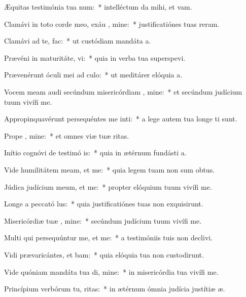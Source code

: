 \item Æquitas testimónia tua  num:~* intelléctum da mihi, et vam.
\item Clamávi in toto corde meo, exáu , mine:~* justificatiónes tuas reram.
\item Clamávi ad te,   fac:~* ut custódiam mandáta a.
\item Prævéni in maturitáte,  vi:~* quia in verba tua superspevi.
\item Prævenérunt óculi mei ad  culo:~* ut meditárer elóquia a.
\item Vocem meam audi secúndum misericórdiam , mine:~* et secúndum judícium tuum vivífi me.
\item Appropinquavérunt persequéntes me inti:~* a lege autem tua longe ti sunt.
\item Prope  , mine:~* et omnes viæ tuæ ritas.
\item Inítio cognóvi de testimó is:~* quia in ætérnum fundásti a.
\item Vide humilitátem meam, et  me:~* quia legem tuam non sum obtus.
\item Júdica judícium meum, et  me:~* propter elóquium tuum vivífi me.
\item Longe a peccató lus:~* quia justificatiónes tuas non exquisirunt.
\item Misericórdiæ tuæ , mine:~* secúndum judícium tuum vivífi me.
\item Multi qui persequúntur me, et  me:~* a testimóniis tuis non declivi.
\item Vidi prævaricántes, et bam:~* quia elóquia tua non custodirunt.
\item Vide quóniam mandáta tua di, mine:~* in misericórdia tua vivífi me.
\item Princípium verbórum tu, ritas:~* in ætérnum ómnia judícia justítiæ æ.
